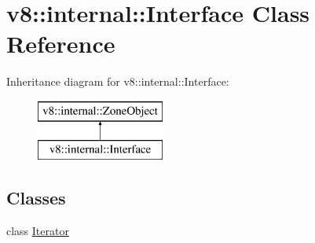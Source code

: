 \hypertarget{classv8_1_1internal_1_1_interface}{}\section{v8\+:\+:internal\+:\+:Interface Class Reference}
\label{classv8_1_1internal_1_1_interface}
Inheritance diagram for v8\+:\+:internal\+:\+:Interface\+:\begin{figure}[H]
\begin{center}
\leavevmode
\includegraphics[height=2.000000cm]{classv8_1_1internal_1_1_interface}
\end{center}
\end{figure}
\subsection*{Classes}
\begin{DoxyCompactItemize}
\item 
class \hyperlink{classv8_1_1internal_1_1_interface_1_1_iterator}{Iterator}
\end{DoxyCompactItemize}
